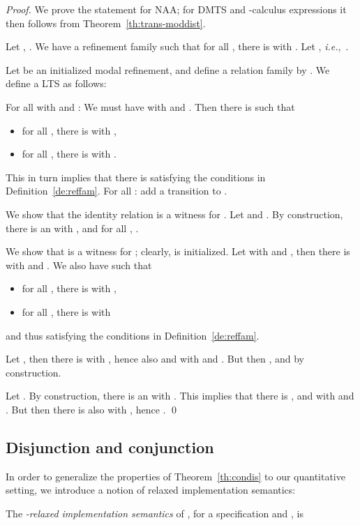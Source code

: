 \documentclass[twocolumn]{svjour3-dummy}
\newcommand*\ie{\textit{i.e.},}
\newcommand*\NAA{NAA\xspace}
\begin{document}
\begin{proof}We prove the statement for \NAA; for DMTS and -calculus
  expressions it then follows from Theorem~\ref{th:trans-moddist}.

  Let , .
  We have a refinement family  such that for all , there is
   with .
  Let , \ie~.

  Let  be an initialized modal refinement,
  and define a relation family  by .  We define a LTS  as follows:

  For all  with  and : We must have  with  and .  Then there is  such that
  \begin{itemize}
  \item for all , there is  with ,
  \item for all , there is  with .
  \end{itemize}
  This in turn implies that there is  satisfying
  the conditions in Definition~\ref{de:reffam}.  For all : add a transition  to .

  We show that the identity relation  is
  a witness for .  Let  and .  By construction, there is an  with , and for all , .

  We show that  is a witness for ; clearly,
   is initialized.  Let  with 
  and , then there is  with  and .  We also have  such that
  \begin{itemize}
  \item for all , there is  with ,
  \item for all , there is  with 
  \end{itemize}
  and thus  satisfying the conditions in
  Definition~\ref{de:reffam}.

  Let , then there is  with , hence also  and  with
   and .  But then , and 
  by construction.

  Let .  By construction, there is an  with .  This implies that there is
  ,  and  with
   and .
  But then there is also  with , hence
  . \qed
\end{proof}

\subsection{Disjunction and conjunction}

In order to generalize the properties of Theorem~\ref{th:condis} to our
quantitative setting, we introduce a notion of relaxed implementation
semantics:

\begin{definition}
  The \emph{-relaxed implementation semantics} of , for a
  specification  and , is
  
\end{definition}
\end{document}
